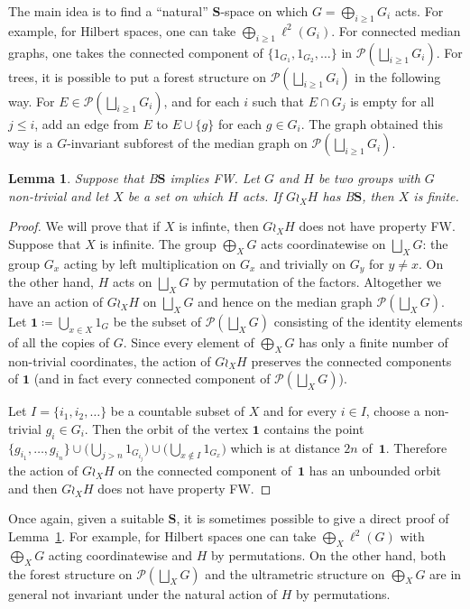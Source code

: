 \documentclass[a4paper]{article}
\newtheorem{lem}{Lemma}[section]
\theoremstyle{definition}
\newcommand*{\BS}{B$\mathbf{S}$}
\newcommand*{\powerset}[1]{\mathcal P(#1)}
\begin{document}
The main idea is to find a ``natural'' $\mathbf S$-space on which $G=\bigoplus_{i\geq 1}G_i$ acts. For example, for Hilbert spaces, one can take $\bigoplus_{i\geq 1}\ell^2(G_i)$. For connected median graphs, one takes the connected component of $\{1_{G_1},1_{G_2},\dots\}$ in $\powerset{\bigsqcup_{i\geq 1} G_i}$.
For trees, it is possible to put a forest structure on $\powerset{\bigsqcup_{i\geq 1} G_i}$ in the following way.
For $E\in\powerset{\bigsqcup_{i\geq 1} G_i}$, and for each $i$ such that $E\cap G_j$ is empty for all $j\leq i$, add an edge from $E$ to $E\cup\{g\}$ for each $g\in G_i$. The graph obtained this way is a $G$-invariant subforest of the median graph on $\powerset{\bigsqcup_{i\geq 1} G_i}$.
%
%
\begin{lem}\label{Lemma:XFinite}
Suppose that \BS{} implies FW.
Let $G$ and $H$ be two groups with $G$ non-trivial and let $X$ be a set on which $H$ acts.
If $G\wr_XH$ has \BS, then $X$ is finite.
\end{lem}
\begin{proof}
We will prove that if $X$ is infinte, then $G\wr_XH$ does not have property FW. Suppose that $X$ is infinite.
The group $\bigoplus_XG$ acts coordinatewise on  $\bigsqcup_XG$: the group $G_x$ acting by left multiplication on $G_x$ and trivially on $G_y$ for $y\neq x$. On the other hand, $H$ acts on $\bigsqcup_XG$ by permutation of the factors.
Altogether we have an action of $G\wr_XH$ on $\bigsqcup_XG$ and hence on the median graph $\powerset{\bigsqcup_XG}$.
Let $\mathbf 1\coloneqq\bigcup_{x\in X} 1_{G}$ be the subset of $\powerset{\bigsqcup_XG}$ consisting of the identity elements of all the copies of $G$.
Since every element of $\bigoplus_XG$ has only a finite number of non-trivial coordinates, the action of $G\wr_XH$ preserves the connected components of $\mathbf 1$ (and in fact every connected component of $\powerset{\bigsqcup_XG}$).

Let $I=\{i_1,i_2,\dots\}$ be a countable subset of $X$ and for every $i\in I$, choose a non-trivial $g_i\in G_{i}$.
Then the orbit of the vertex $\mathbf 1$ contains the point $\{g_{i_1},\dots, g_{i_n}\}\cup\bigl(\bigcup_{j>n} 1_{G_{i_j}}\bigr)\cup\bigl(\bigcup_{x\notin I} 1_{G_{x}}\bigr)$ which is at distance $2n$ of~$\mathbf 1$.
Therefore the action of $G\wr_XH$ on the connected component of~$\mathbf 1$ has an unbounded orbit and then $G\wr_XH$ does not have property FW.
\end{proof}
%
%
Once again, given a suitable $\mathbf{S}$, it is sometimes possible to give a direct proof of Lemma~\ref{Lemma:XFinite}.
For example, for Hilbert spaces one can take $\bigoplus_X\ell^2(G)$ with $\bigoplus_XG$ acting coordinatewise and $H$ by permutations.
On the other hand, both the forest structure on $\powerset{\bigsqcup_XG}$ and the ultrametric structure on $\bigoplus_XG$ are in general not invariant under the natural action of $H$ by permutations.
\end{document}
